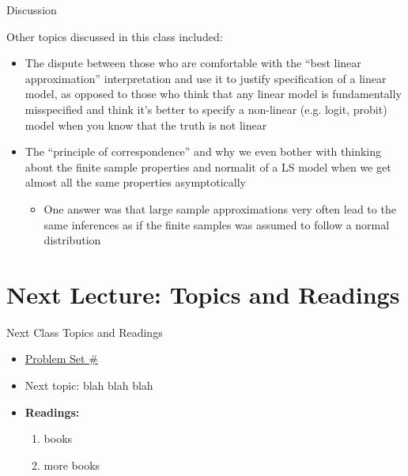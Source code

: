 \documentclass[fleqn, 10pt]{beamer}
\begin{document}
\begin{frame}{Discussion}
	
	Other topics discussed in this class included:
	\begin{itemize}
		\item The dispute between those who are comfortable with the ``best linear approximation'' interpretation and use it to justify specification of a linear model, as opposed to those who think that any linear model is fundamentally misspecified and think it's better to specify a non-linear (e.g. logit, probit) model when you know that the truth is not linear
		\item The ``principle of correspondence'' and why we even bother with thinking about the finite sample properties and normalit of a LS model when we get almost all the same properties asymptotically
		\begin{itemize}
			\item One answer was that large sample approximations very often lead to the same inferences as if the finite samples was assumed to follow a normal distribution
		\end{itemize}
	\end{itemize}
	
\end{frame}

\section{Next Lecture: Topics and Readings}

\begin{frame}{Next Class Topics and Readings}
	
	\begin{itemize}
		\item \underline{Problem Set \#}
		\item Next topic: blah blah blah
		\item \textbf{Readings:}
		\begin{enumerate}
			\item books
			\item more books
		\end{enumerate}
	\end{itemize}
	
\end{frame}
\end{document}
